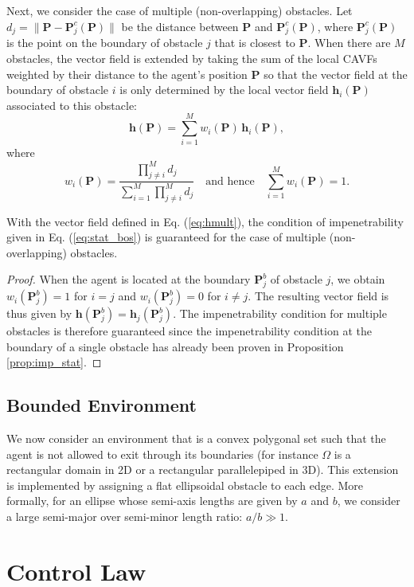 Next, we consider the case of multiple (non-overlapping) obstacles.
Let $d_j = \|\bm{P}-\bm{P}^c_j(\bm{P})\|$ be the distance between $\bm{P}$ and $\bm{P}^c_j(\bm{P})$, where $\bm{P}^c_j(\bm{P})$ is the point on the boundary of obstacle $j$ that is closest to $\bm{P}$.
When there are $M$ obstacles, the vector field is extended by taking the sum of the local CAVFs weighted by their distance to the agent's position $\bm{P}$ so that the vector field at the boundary of obstacle $i$ is only determined by the local vector field $\bm{h}_i(\bm{P})$ associated to this obstacle: 
\begin{equation} \label{eq:hmult}
    \bm{h}(\bm{P}) = \sum_{i=1}^M w_i(\bm{P}) \, \bm{h}_i(\bm{P}),
\end{equation}
where
\[
    w_i(\bm{P}) = \frac{\prod_{j\neq i}^M d_j}{\sum_{i=1}^M \prod_{j\neq i}^M d_j} \quad \textrm{and hence} \quad \sum_{i=1}^M w_i(\bm{P}) = 1.
\]
\begin{proposition}
With the vector field defined in Eq. (\ref{eq:hmult}), the condition of impenetrability given in Eq. (\ref{eq:stat_bos}) is guaranteed for the case of multiple (non-overlapping) obstacles.
\end{proposition}
\begin{proof}
When the agent is located at the boundary $\bm{P}^b_j$ of obstacle $j$, we obtain $w_i(\bm{P}^b_j) = 1$ for $i = j$ and $w_i(\bm{P}^b_j) = 0$ for $i \neq j$. The resulting vector field is thus given by $\bm{h}(\bm{P}^b_j) = \bm{h}_j(\bm{P}^b_j)$. The impenetrability condition for multiple obstacles is therefore guaranteed since the impenetrability condition at the boundary of a single obstacle has already been proven in Proposition \ref{prop:imp_stat}.
\end{proof}

\subsection{Bounded Environment}

We now consider an environment that is a convex polygonal set such that the agent is not allowed to exit through its boundaries (for instance $\Omega$ is a rectangular domain in 2D or a rectangular parallelepiped in 3D). This extension is implemented by assigning a flat ellipsoidal obstacle to each edge. More formally, for an ellipse whose semi-axis lengths are given by $a$ and $b$, we consider a large semi-major over semi-minor length ratio: $a/b \gg 1$. 

\section{Control Law} \label{sec:control}

